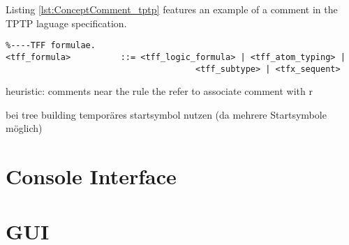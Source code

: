 Listing \ref{lst:ConceptComment_tptp} features an example of a comment in the \ac{TPTP} laguage specification.
\begin{lstlisting}[basicstyle=\scriptsize	,caption= Example of a comment in the \ac{TPTP} language specification,label= lst:ConceptComment_tptp]
%----Top of Page---------------------------------------------------------------
%----TFF formulae.
<tff_formula>          ::= <tff_logic_formula> | <tff_atom_typing> |
                           			  <tff_subtype> | <tfx_sequent>
\end{lstlisting}
heuristic:
comments near the rule the refer to
associate comment with r

bei tree building temporäres startsymbol nutzen (da mehrere Startsymbole möglich)

\section{Console Interface}\label{sec:Console Interface}

\section{GUI}\label{sec:ConceptGUI}


